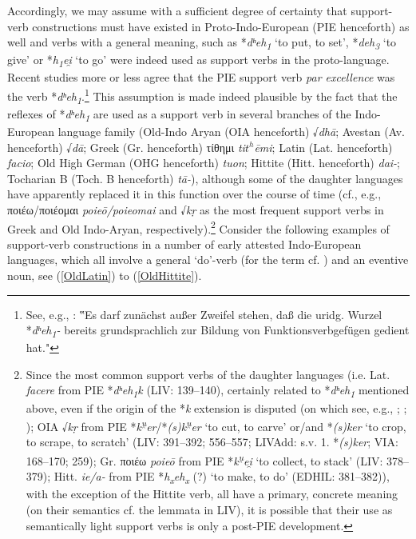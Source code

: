 \documentclass[output=paper,colorlinks,citecolor=brown]{langscibook}
\begin{document}
Accordingly, we may assume with a sufficient degree of certainty that support-verb constructions must have existed in Proto-Indo-European (PIE henceforth) as well and verbs with a general meaning, such as *\textit{dʰeh\textsubscript{1}} ‘to put, to set’, *\textit{deh\textsubscript{3}} ‘to give’ or *\textit{h\textsubscript{1}ei̯} ‘to go’ were indeed used as support verbs in the proto-language. Recent studies more or less agree that the PIE support verb \textit{par excellence} was the verb *\textit{dʰeh\textsubscript{1}}.\footnote{See, e.g., \citet[6]{Hackstein2002b}:
‟Es darf zunächst außer Zweifel stehen, daß die uridg. Wurzel *\textit{dʰeh\textsubscript{1}-} bereits grundsprachlich zur Bildung von Funktionsverbgefügen gedient hat."}
This assumption is made indeed plausible by the fact that the reflexes of *\textit{dʰeh\textsubscript{1}} are used as a support verb in several branches of the Indo-European language family (Old-Indo Aryan (OIA henceforth) √\textit{dhā}; Avestan (Av. henceforth) √\textit{dā}; Greek (Gr. henceforth) τίθημι \textit{ti$t^h$ēmi}; Latin (Lat. henceforth) \textit{facio}; Old High German (OHG henceforth) \textit{tuon}; Hittite (Hitt. henceforth) \textit{dai-}; Tocharian B (Toch. B henceforth) \textit{tā-}), although some of the daughter languages have apparently replaced it in this function over the course of time (cf., e.g., ποιέω/ποιέομαι \textit{poieō/poieomai} and √\textit{kṛ} as the most frequent support verbs in Greek and Old Indo-Aryan, respectively).\footnote{Since the most common support verbs of the daughter languages (i.e. Lat. \textit{facere} from PIE *\textit{dʰeh\textsubscript{1}k} (LIV: 139--140), certainly related to *\textit{dʰeh\textsubscript{1}} mentioned above, even if the origin of the *\textit{k} extension is disputed (on which see, e.g., \citealt[148--150]{Harðarson1993}; \citealt{Untermann1993}; \citealt{Korltandt2018}); OIA √\textit{kṛ} from PIE *\textit{k\textsuperscript{u̯}er}/*\textit{(s)k\textsuperscript{u̯}er} ‘to cut, to carve’ or/and *\textit{(s)ker} ‘to crop, to scrape, to scratch’ (LIV: 391--392; 556--557; LIVAdd: s.v. 1. *\textit{(s)ker}; VIA: 168--170; 259); Gr. ποιέω \textit{poieō} from PIE *\textit{k\textsuperscript{u̯}ei̯} ‘to collect, to stack’ (LIV: 378--379); Hitt. \textit{ie/a-} from PIE *\textit{h\textsubscript{x}eh\textsubscript{x}} (?) ‘to make, to do’ (EDHIL: 381--382)), with the exception of the Hittite verb, all have a primary, concrete meaning (on their semantics cf. the lemmata in LIV), it is possible that their use as semantically light support verbs is only a post-PIE development.}
Consider the following examples of support-verb constructions in a number of early attested Indo-European languages, which all involve a general `do'-verb (for the term cf. \citealt{SchultzeBerndt2008}) and an eventive noun, see (\ref{OldLatin}) to (\ref{OldHittite}).
\end{document}
